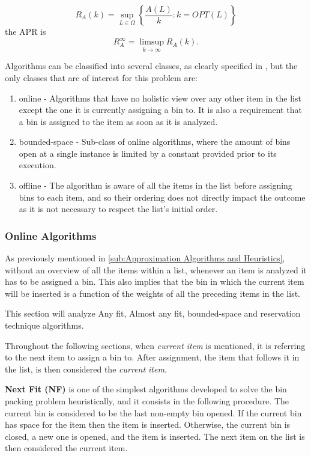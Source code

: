\begin{equation}
    R_A (k) = \sup_{L \in \Omega} \left \{ \frac{A(L)}{k} : k = OPT(L) \right \}
\end{equation}
the APR is
\begin{equation}
    R_A^\infty = \limsup_{k \to \infty} R_A(k).
\end{equation}

Algorithms can be classified into several classes, as clearly specified in \cite{coffman2013bin}, but the only classes that are of interest for this problem are:
\begin{enumerate}
    \item online - Algorithms that have no holistic view over any other item in the list except the one it is currently assigning a bin to. It is also a requirement that a bin is assigned to the item as soon as it is analyzed.
    \item bounded-space - Sub-class of online algorithms, where the amount of bins open at a single instance is limited by a constant provided prior to its execution.
    \item offline - The algorithm is aware of all the items in the list before assigning bins to each item, and so their ordering does not directly impact the outcome as it is not necessary to respect the list's initial order.
\end{enumerate}

\subsubsection{Online Algorithms}

As previously mentioned in \ref{sub:Approximation Algorithms and Heuristics}, without an overview of all the items within a list, whenever an item is analyzed it has to be assigned a bin. This also implies that the bin in which the current item will be inserted is a function of the weights of all the preceding items in the list.

This section will analyze Any fit, Almost any fit, bounded-space and reservation technique algorithms.

Throughout the following sections, when \textit{current item} is mentioned, it is referring to the next item to assign a bin to. After assignment, the item that follows it in the list, is then considered the \textit{current item}.

\textbf{Next Fit (NF)} is one of the simplest algorithms developed to solve the bin packing problem heuristically, and it consists in the following procedure. The current bin is considered to be the last non-empty bin opened. If the current bin has space for the item then the item is inserted. Otherwise, the current bin is closed, a new one is opened, and the item is inserted. The next item on the list is then considered the current item.

